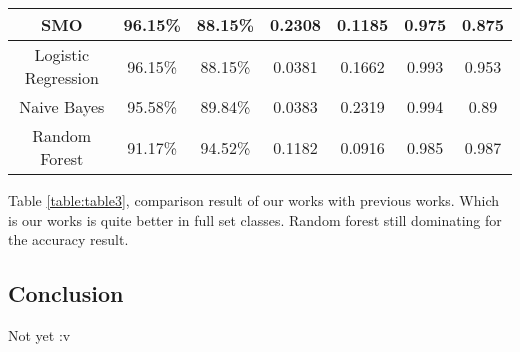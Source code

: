 \begin{table}[]
{\begin{tabular}{|c|c|c|c|c|c|c|}
SMO                             & 96.15\%            & 88.15\%           & 0.2308                  & 0.1185                  & 0.975                & 0.875                \\ \hline
Logistic Regression             & 96.15\%            & 88.15\%           & 0.0381                  & 0.1662                  & 0.993                & 0.953                \\ \hline
Naive Bayes                     & 95.58\%            & 89.84\%           & 0.0383                  & 0.2319                  & 0.994                & 0.89                 \\ \hline
Random Forest                   & 91.17\%            & 94.52\%           & 0.1182                  & 0.0916                  & 0.985                & 0.987                \\ \hline
\end{tabular}%
}
\end{table}

Table \ref{table:table3}, comparison result of our works with previous works. Which is our works is quite better in full set classes. Random forest still dominating for the accuracy result.

\subsection{Conclusion}
\label{sec:conclusion}

Not yet :v
